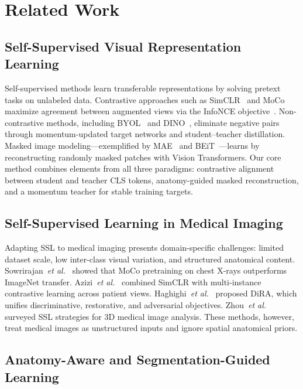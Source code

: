 \section{Related Work}
\label{sec:related_work}

\subsection{Self-Supervised Visual Representation Learning}

Self-supervised methods learn transferable representations by solving pretext tasks on unlabeled data. Contrastive approaches such as SimCLR~\cite{chen2020simclr} and MoCo~\cite{he2020moco} maximize agreement between augmented views via the InfoNCE objective~\cite{oord2018infonce}. Non-contrastive methods, including BYOL~\cite{grill2020byol} and DINO~\cite{caron2021dino}, eliminate negative pairs through momentum-updated target networks and student--teacher distillation. Masked image modeling---exemplified by MAE~\cite{he2022mae} and BEiT~\cite{bao2022beit}---learns by reconstructing randomly masked patches with Vision Transformers. Our core method combines elements from all three paradigms: contrastive alignment between student and teacher CLS tokens, anatomy-guided masked reconstruction, and a momentum teacher for stable training targets.

\subsection{Self-Supervised Learning in Medical Imaging}

Adapting SSL to medical imaging presents domain-specific challenges: limited dataset scale, low inter-class visual variation, and structured anatomical content. Sowrirajan~\textit{et al.}~\cite{sowrirajan2021mococxr} showed that MoCo pretraining on chest X-rays outperforms ImageNet transfer. Azizi~\textit{et al.}~\cite{azizi2021medical} combined SimCLR with multi-instance contrastive learning across patient views. Haghighi~\textit{et al.}~\cite{haghighi2022dira} proposed DiRA, which unifies discriminative, restorative, and adversarial objectives. Zhou~\textit{et al.}~\cite{zhou2023medicalssl} surveyed SSL strategies for 3D medical image analysis. These methods, however, treat medical images as unstructured inputs and ignore spatial anatomical priors.

\subsection{Anatomy-Aware and Segmentation-Guided Learning}

